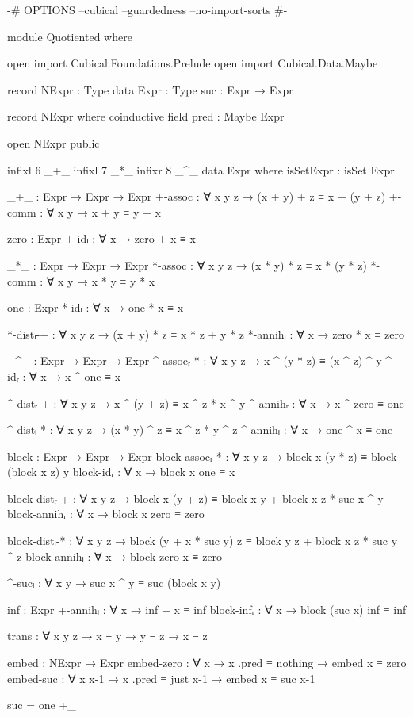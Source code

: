 \begin{code}[hide]
{-# OPTIONS --cubical --guardedness --no-import-sorts #-}

module Quotiented where

open import Cubical.Foundations.Prelude
open import Cubical.Data.Maybe
\end{code}

\begin{code}
record NExpr : Type
data Expr : Type
suc : Expr → Expr

record NExpr where
  coinductive
  field pred : Maybe Expr

open NExpr public

infixl 6 _+_
infixl 7 _*_
infixr 8 _^_
data Expr where
  isSetExpr : isSet Expr

  _+_ : Expr → Expr → Expr
  +-assoc : ∀ x y z → (x + y) + z ≡ x + (y + z)
  +-comm : ∀ x y → x + y ≡ y + x

  zero : Expr
  +-idₗ : ∀ x → zero + x ≡ x

  _*_ : Expr → Expr → Expr
  *-assoc : ∀ x y z → (x * y) * z ≡ x * (y * z)
  *-comm : ∀ x y → x * y ≡ y * x

  one : Expr
  *-idₗ : ∀ x → one * x ≡ x

  *-distₗ-+ : ∀ x y z → (x + y) * z ≡ x * z + y * z
  *-annihₗ : ∀ x → zero * x ≡ zero

  _^_ : Expr → Expr → Expr
  ^-assocᵣ-* : ∀ x y z → x ^ (y * z) ≡ (x ^ z) ^ y
  ^-idᵣ : ∀ x → x ^ one ≡ x

  ^-distᵣ-+ : ∀ x y z → x ^ (y + z) ≡ x ^ z * x ^ y
  ^-annihᵣ : ∀ x → x ^ zero ≡ one

  ^-distₗ-* : ∀ x y z → (x * y) ^ z ≡ x ^ z * y ^ z
  ^-annihₗ : ∀ x → one ^ x ≡ one

  block : Expr → Expr → Expr
  block-assocᵣ-* : ∀ x y z → block x (y * z) ≡ block (block x z) y
  block-idᵣ : ∀ x → block x one ≡ x

  block-distᵣ-+ :
    ∀ x y z → block x (y + z) ≡ block x y + block x z * suc x ^ y
  block-annihᵣ : ∀ x → block x zero ≡ zero

  block-distₗ-* :
    ∀ x y z → block (y + x * suc y) z ≡ block y z + block x z * suc y ^ z
  block-annihₗ : ∀ x → block zero x ≡ zero

  ^-sucₗ : ∀ x y → suc x ^ y ≡ suc (block x y)

  inf : Expr
  +-annihₗ : ∀ x → inf + x ≡ inf
  block-infᵣ : ∀ x → block (suc x) inf ≡ inf

  trans : ∀ {x y z} → x ≡ y → y ≡ z → x ≡ z

  embed : NExpr → Expr
  embed-zero : ∀ x → x .pred ≡ nothing → embed x ≡ zero
  embed-suc : ∀ x x-1 → x .pred ≡ just x-1 → embed x ≡ suc x-1

suc = one +_
\end{code}
